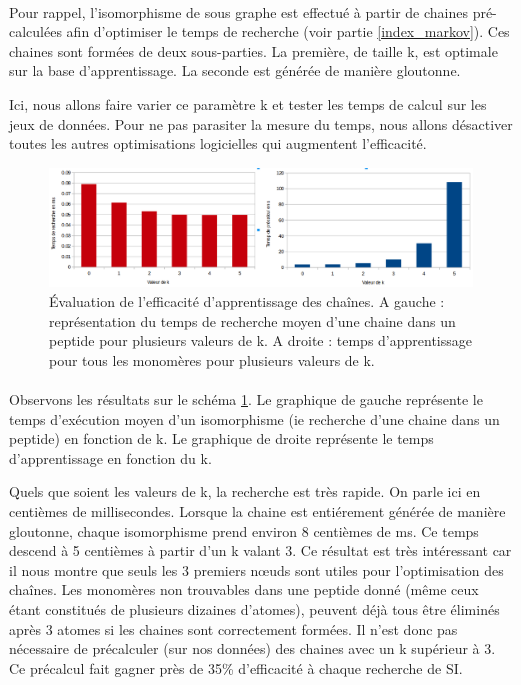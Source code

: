 \documentclass[12pt,french,twoside]{report}
\begin{document}
\paragraph{}Pour rappel, l'isomorphisme de sous graphe est effectué à partir de chaines pré-calculées afin d'optimiser le temps de recherche (voir partie \ref{index_markov}).
Ces chaines sont formées de deux sous-parties.
La première, de taille k, est optimale sur la base d'apprentissage.
La seconde est générée de manière gloutonne.

Ici, nous allons faire varier ce paramètre k et tester les temps de calcul sur les jeux de données.
Pour ne pas parasiter la mesure du temps, nous allons désactiver toutes les autres optimisations logicielles qui augmentent l'efficacité.

\begin{figure}[!ht]
  \begin{center}
    \includegraphics[width=450px]{Figures/s2m/results/k.png}
    \caption{\label{k_graph}Évaluation de l'efficacité d'apprentissage des chaînes.
    A gauche : représentation du temps de recherche moyen d'une chaine dans un peptide pour plusieurs valeurs de k.
    A droite : temps d'apprentissage pour tous les monomères pour plusieurs valeurs de k.}
  \end{center}
\end{figure}

\paragraph{}Observons les résultats sur le schéma \ref{k_graph}.
Le graphique de gauche représente le temps d'exécution moyen d'un isomorphisme (ie recherche d'une chaine dans un peptide) en fonction de k.
Le graphique de droite représente le temps d'apprentissage en fonction du k.

Quels que soient les valeurs de k, la recherche est très rapide.
On parle ici en centièmes de millisecondes.
Lorsque la chaine est entiérement générée de manière gloutonne, chaque isomorphisme prend environ 8 centièmes de ms.
Ce temps descend à 5 centièmes à partir d'un k valant 3.
Ce résultat est très intéressant car il nous montre que seuls les 3 premiers n\oe{}uds sont utiles pour l'optimisation des chaînes.
Les monomères non trouvables dans une peptide donné (même ceux étant constitués de plusieurs dizaines d'atomes), peuvent déjà tous être éliminés après 3 atomes si les chaines sont correctement formées.
Il n'est donc pas nécessaire de précalculer (sur nos données) des chaines avec un k supérieur à 3.
Ce précalcul fait gagner près de 35\% d'efficacité à chaque recherche de SI.
\end{document}
